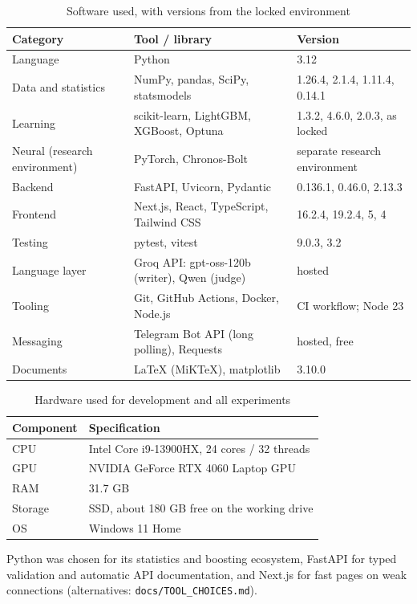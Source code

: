 \begin{table}[!t]
\centering
\caption{Software used, with versions from the locked environment}
\label{tab:software-req}
\small
\begin{tabular}{|p{3.6cm}|p{5.8cm}|p{5.0cm}|}
\hline
\textbf{Category} & \textbf{Tool / library} & \textbf{Version} \\ \hline
Language & Python & 3.12 \\ \hline
Data and statistics & NumPy, pandas, SciPy, statsmodels & 1.26.4, 2.1.4, 1.11.4, 0.14.1 \\ \hline
Learning & scikit-learn, LightGBM, XGBoost, Optuna & 1.3.2, 4.6.0, 2.0.3, as locked \\ \hline
Neural (research environment) & PyTorch, Chronos-Bolt & separate research environment \\ \hline
Backend & FastAPI, Uvicorn, Pydantic & 0.136.1, 0.46.0, 2.13.3 \\ \hline
Frontend & Next.js, React, TypeScript, Tailwind CSS & 16.2.4, 19.2.4, 5, 4 \\ \hline
Testing & pytest, vitest & 9.0.3, 3.2 \\ \hline
Language layer & Groq API: gpt-oss-120b (writer), Qwen (judge) & hosted \\ \hline
Tooling & Git, GitHub Actions, Docker, Node.js & CI workflow; Node 23 \\ \hline
Messaging & Telegram Bot API (long polling), Requests & hosted, free \\ \hline
Documents & \LaTeX{} (MiKTeX), matplotlib & 3.10.0 \\ \hline
\end{tabular}
\end{table}

\begin{table}[!t]
\centering
\caption{Hardware used for development and all experiments}
\label{tab:hardware-req}
\small
\begin{tabular}{|l|l|}
\hline
\textbf{Component} & \textbf{Specification} \\ \hline
CPU & Intel Core i9-13900HX, 24 cores / 32 threads \\ \hline
GPU & NVIDIA GeForce RTX 4060 Laptop GPU \\ \hline
RAM & 31.7 GB \\ \hline
Storage & SSD, about 180 GB free on the working drive \\ \hline
OS & Windows 11 Home \\ \hline
\end{tabular}
\end{table}

Python was chosen for its statistics and boosting ecosystem, FastAPI for typed validation and automatic API documentation, and Next.js for fast pages on weak connections (alternatives: \texttt{docs/TOOL\_CHOICES.md}).

